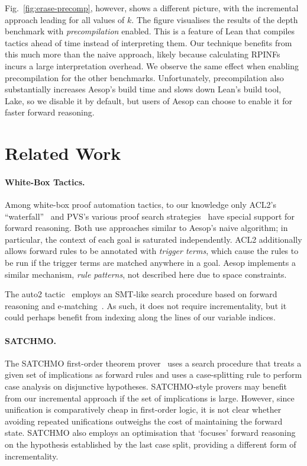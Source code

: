 \documentclass[runningheads,leqno]{llncs}
\newcommand{\para}[1]{\paragraph{\bfseries\upshape #1}}
\begin{document}
Fig.~\ref{fig:erase-precomp}, however, shows a different picture, with the incremental approach leading for all values of $k$.
The figure visualises the results of the depth benchmark with \emph{precompilation} enabled.
This is a feature of Lean that compiles tactics ahead of time instead of interpreting them.
Our technique benefits from this much more than the naive approach, likely because calculating RPINFs incurs a large interpretation overhead.
We observe the same effect when enabling precompilation for the other benchmarks.
Unfortunately, precompilation also substantially increases Aesop's build time and slows down Lean's build tool, Lake, so we disable it by default, but users of Aesop can choose to enable it for faster forward reasoning.

\section{Related Work}

\para{White-Box Tactics.}
Among white-box proof automation tactics, to our knowledge only ACL2's \enquote{waterfall}~\cite{ACL2} and PVS's various proof search strategies~\cite{PVS} have special support for forward reasoning.
Both use approaches similar to Aesop's naive algorithm; in particular, the context of each goal is saturated independently.
ACL2 additionally allows forward rules to be annotated with \emph{trigger terms}, which cause the rules to be run if the trigger terms are matched anywhere in a goal.
Aesop implements a similar mechanism, \emph{rule patterns}, not described here due to space constraints.

The auto2 tactic~\cite{auto2} employs an SMT-like search procedure based on forward reasoning and e-matching~\cite{simplify}.
As such, it does not require incrementality, but it could perhaps benefit from indexing along the lines of our variable indices.

\para{SATCHMO.}
The SATCHMO first-order theorem prover~\cite{SATCHMO} uses a search procedure that treats a given set of implications as forward rules and uses a case-splitting rule to perform case analysis on disjunctive hypotheses.
SATCHMO-style provers may benefit from our incremental approach if the set of implications is large.
However, since unification is comparatively cheap in first-order logic, it is not clear whether avoiding repeated unifications outweighs the cost of maintaining the forward state.
SATCHMO also employs an optimisation that \enquote*{focuses} forward reasoning on the hypothesis established by the last case split, providing a different form of incrementality.
\end{document}
